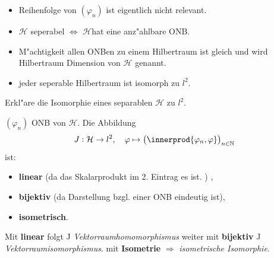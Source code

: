 \documentclass[9pt]{article}
\newcommand{\Hi}{\mathcal{H}}
\DeclarePairedDelimiter{\innerprod}\langle\rangle
\newenvironment{field}{}{\newpage}
\newif\ifnote
\newenvironment{note}{\notetrue}{\notefalse}
\begin{document}
\begin{note}
		\begin{field}  %
			\begin{itemize}
				\item Reihenfolge von $(\varphi_n)$ ist eigentlich nicht relevant.
				\item $\Hi$ seperabel $\Leftrightarrow$ $\Hi$hat eine anz"ahlbare ONB.
				\item M"achtigkeit allen ONBen zu einem Hilbertraum ist gleich und wird Hilbertraum Dimension von $\Hi$ genannt. 
				\item jeder seperable Hilbertraum ist isomorph zu $l^2$.
			\end{itemize}
		\end{field}
			
		\begin{field}  %
			Erkl"are die Isomorphie eines separablen $\Hi$ zu $l^2$.  
		\end{field}
		
		\begin{field}  %
			$(\varphi_n)$ ONB von $\Hi$. Die Abbildung 
			\begin{equation*}
				J: \Hi \rightarrow l^2,\quad \varphi \mapsto \qty(\innerprod{\varphi_n, \varphi})_{n\in \mathbb{N}}
			\end{equation*}
			ist: 
			\begin{itemize}
				\item \textbf{linear} (da das Skalarprodukt im 2. Eintrag es ist. ) ,
				\item \textbf{bijektiv} (da Darstellung bzgl. einer ONB eindeutig ist),
				\item \textbf{isometrisch}.
			\end{itemize}
		Mit \textbf{linear} folgt J \textit{Vektorraumhomomorphismus} weiter mit \textbf{bijektiv} J \textit{Vektorraumisomorphismus}. 
		 mit \textbf{Isometrie} $\Rightarrow$ \textit{isometrische Isomorphie}. 
		\end{field}
	\end{note}
\end{document}
